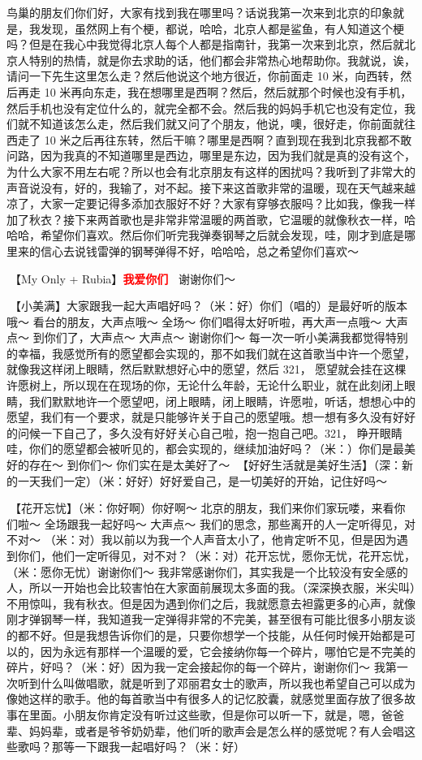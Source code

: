 \documentclass[
]{book}
\begin{document}
鸟巢的朋友们你们好，大家有找到我在哪里吗？话说我第一次来到北京的印象就是，我发现，虽然网上有个梗，都说，哈哈，北京人都是鲨鱼，有人知道这个梗吗？但是在我心中我觉得北京人每个人都是指南针，我第一次来到北京，然后就北京人特别的热情，就是你去求助的话，他们都会非常热心地帮助你。我就说，诶，请问一下先生这里怎么走？然后他说这个地方很近，你前面走 10 米，向西转，然后再走 10 米再向东走，我在想哪里是西啊？然后，然后就那个时候也没有手机，然后手机也没有定位什么的，就完全都不会。然后我的妈妈手机它也没有定位，我们就不知道该怎么走，然后我们就又问了个朋友，他说，噢，很好走，你前面就往西走了 10 米之后再往东转，然后干嘛？哪里是西啊？直到现在我到北京我都不敢问路，因为我真的不知道哪里是西边，哪里是东边，因为我们就是真的没有这个，为什么大家不用左右呢？所以也会有北京朋友有这样的困扰吗？我听到了非常大的声音说没有，好的，我输了，对不起。接下来这首歌非常的温暖，现在天气越来越凉了，大家一定要记得多添加衣服好不好？大家有穿够衣服吗？比如我，像我一样加了秋衣？接下来两首歌也是非常非常温暖的两首歌，它温暖的就像秋衣一样，哈哈哈，希望你们喜欢。然后你们听完我弹奏钢琴之后就会发现，哇，刚才到底是哪里来的信心去说钱雷弹的钢琴弹得不好，哈哈哈，总之希望你们喜欢～

🎵【My Only + Rubia】\textbf{\textcolor{red}{我爱你们~} } 谢谢你们～

🎵【小美满】大家跟我一起大声唱好吗？（米：好）你们（唱的）是最好听的版本哦～ 看台的朋友，大声点哦～ 全场～ 你们唱得太好听啦，再大声一点哦～ 大声点～ 到你们了，大声点～ 大声点～ 谢谢你们～ 每一次一听小美满我都觉得特别的幸福，我感觉所有的愿望都会实现的，那不如我们就在这首歌当中许一个愿望，就像我这样闭上眼睛，然后默默想好心中的愿望，然后 321， 愿望就会挂在这棵许愿树上，所以现在在现场的你，无论什么年龄，无论什么职业，就在此刻闭上眼睛，我们默默地许一个愿望吧，闭上眼睛，闭上眼睛，许愿啦，听话，想想心中的愿望，我们有一个要求，就是只能够许关于自己的愿望哦。想一想有多久没有好好的问候一下自己了，多久没有好好关心自己啦，抱一抱自己吧。321， 睁开眼睛哇，你们的愿望都会被听见的，都会实现的，继续加油好吗？（米：）你们是最美好的存在～ 到你们～ 你们实在是太美好了～ 🎵【好好生活就是美好生活】（深：新的一天我们一定）（米：好好）好好爱自己，是一切美好的开始，记住好吗～

🎵【花开忘忧】（米：你好啊）你好啊～ 北京的朋友，我们来你们家玩喽，来看你们啦～ 全场跟我一起好吗～ 大声点～ 我们的思念，那些离开的人一定听得见，对不对～ （米：对）我以前以为我一个人声音太小了，他肯定听不见，但是因为遇到你们，他们一定听得见，对不对？（米：对）花开忘忧，愿你无忧，花开忘忧，（米：愿你无忧）谢谢你们～
我非常感谢你们，其实我是一个比较没有安全感的人，所以一开始也会比较害怕在大家面前展现太多面的我。（深深换衣服，米尖叫）不用惊叫，我有秋衣。但是因为遇到你们之后，我就愿意去袒露更多的心声，就像刚才弹钢琴一样，我知道我一定弹得非常的不完美，甚至很有可能比很多小朋友谈的都不好。但是我想告诉你们的是，只要你想学一个技能，从任何时候开始都是可以的，因为永远有那样一个温暖的爱，它会接纳你每一个碎片，哪怕它是不完美的碎片，好吗？（米：好）因为我一定会接起你的每一个碎片，谢谢你们～
我第一次听到什么叫做唱歌，就是听到了邓丽君女士的歌声，所以我也希望自己可以成为像她这样的歌手。他的每首歌当中有很多人的记忆胶囊，就感觉里面存放了很多故事在里面。小朋友你肯定没有听过这些歌，但是你可以听一下，就是，嗯，爸爸辈、妈妈辈，或者是爷爷奶奶辈，他们听的歌声会是怎么样的感觉呢？有人会唱这些歌吗？那等一下跟我一起唱好吗？（米：好）
\end{document}
